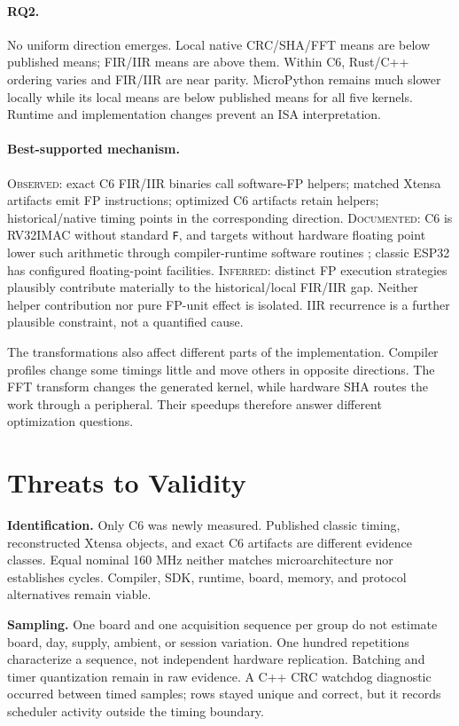 \documentclass[10pt]{article}
\newcommand{\eclass}[1]{\textsc{#1}}
\begin{document}
\paragraph{RQ2.} No uniform direction emerges. Local native CRC/SHA/FFT means are below published means; FIR/IIR means are above them. Within C6, Rust/C++ ordering varies and FIR/IIR are near parity. MicroPython remains much slower locally while its local means are below published means for all five kernels. Runtime and implementation changes prevent an ISA interpretation.

\paragraph{Best-supported mechanism.} \eclass{Observed}: exact C6 FIR/IIR binaries call software-FP helpers; matched Xtensa artifacts emit FP instructions; optimized C6 artifacts retain helpers; historical/native timing points in the corresponding direction. \eclass{Documented}: C6 is RV32IMAC without standard \texttt{F}, and targets without hardware floating point lower such arithmetic through compiler-runtime software routines \citep{gccSoftFloat1420}; classic ESP32 has configured floating-point facilities. \eclass{Inferred}: distinct FP execution strategies plausibly contribute materially to the historical/local FIR/IIR gap. Neither helper contribution nor pure FP-unit effect is isolated. IIR recurrence is a further plausible constraint, not a quantified cause.

The transformations also affect different parts of the implementation. Compiler profiles change some timings little and move others in opposite directions. The FFT transform changes the generated kernel, while hardware SHA routes the work through a peripheral. Their speedups therefore answer different optimization questions.

\section{Threats to Validity}
\textbf{Identification.} Only C6 was newly measured. Published classic timing, reconstructed Xtensa objects, and exact C6 artifacts are different evidence classes. Equal nominal 160 MHz neither matches microarchitecture nor establishes cycles. Compiler, SDK, runtime, board, memory, and protocol alternatives remain viable.

\textbf{Sampling.} One board and one acquisition sequence per group do not estimate board, day, supply, ambient, or session variation. One hundred repetitions characterize a sequence, not independent hardware replication. Batching and timer quantization remain in raw evidence. A C++ CRC watchdog diagnostic occurred between timed samples; rows stayed unique and correct, but it records scheduler activity outside the timing boundary.
\end{document}

